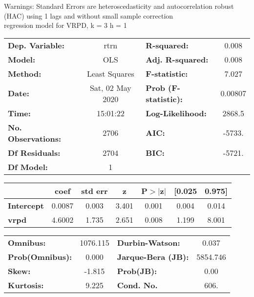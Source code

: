 Warnings: \newline
 [1] Standard Errors are heteroscedasticity and autocorrelation robust (HAC) using 1 lags and without small sample correction\\ 

regression model for VRPD, k = 3 h = 1\begin{center}
\begin{tabular}{lclc}
\toprule
\textbf{Dep. Variable:}    &       rtrn       & \textbf{  R-squared:         } &     0.008   \\
\textbf{Model:}            &       OLS        & \textbf{  Adj. R-squared:    } &     0.008   \\
\textbf{Method:}           &  Least Squares   & \textbf{  F-statistic:       } &     7.027   \\
\textbf{Date:}             & Sat, 02 May 2020 & \textbf{  Prob (F-statistic):} &  0.00807    \\
\textbf{Time:}             &     15:01:22     & \textbf{  Log-Likelihood:    } &    2868.5   \\
\textbf{No. Observations:} &        2706      & \textbf{  AIC:               } &    -5733.   \\
\textbf{Df Residuals:}     &        2704      & \textbf{  BIC:               } &    -5721.   \\
\textbf{Df Model:}         &           1      & \textbf{                     } &             \\
\bottomrule
\end{tabular}
\begin{tabular}{lcccccc}
                   & \textbf{coef} & \textbf{std err} & \textbf{z} & \textbf{P$> |$z$|$} & \textbf{[0.025} & \textbf{0.975]}  \\
\midrule
\textbf{Intercept} &       0.0087  &        0.003     &     3.401  &         0.001        &        0.004    &        0.014     \\
\textbf{vrpd}      &       4.6002  &        1.735     &     2.651  &         0.008        &        1.199    &        8.001     \\
\bottomrule
\end{tabular}
\begin{tabular}{lclc}
\textbf{Omnibus:}       & 1076.115 & \textbf{  Durbin-Watson:     } &    0.037  \\
\textbf{Prob(Omnibus):} &   0.000  & \textbf{  Jarque-Bera (JB):  } & 5854.746  \\
\textbf{Skew:}          &  -1.815  & \textbf{  Prob(JB):          } &     0.00  \\
\textbf{Kurtosis:}      &   9.225  & \textbf{  Cond. No.          } &     606.  \\
\bottomrule
\end{tabular}
\end{center}

